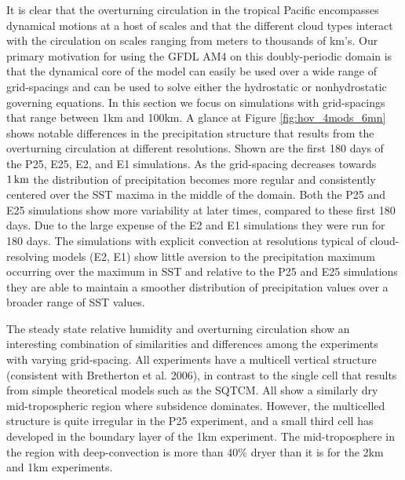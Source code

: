 \documentclass[11pt]{article}   	%
\begin{document}
It is clear that the overturning circulation in the tropical Pacific encompasses dynamical motions at a host of scales and that the 
different cloud types interact with the circulation on scales ranging from meters to thousands of km's.  
Our primary motivation for using the GFDL AM4 on this doubly-periodic domain is that the dynamical core of the model can 
easily be used over a wide range of grid-spacings and can be used to solve either the hydrostatic or nonhydrostatic 
governing equations.  In this section we focus on simulations with grid-spacings that range between 1km and 100km.   
A glance at Figure \ref{fig:hov_4mods_6mn} shows notable differences in the precipitation structure that results from the 
overturning circulation at different resolutions.  Shown are the first 180 days of the P25, E25, E2, and E1 simulations.  As the 
grid-spacing decreases towards $1 \, \rm{km}$ the distribution of precipitation becomes more regular and consistently 
centered over the SST maxima in the middle of the domain.  Both the P25 and E25 simulations show more variability at later 
times, compared to these first 180 days.  Due to the large expense of the E2 and E1 simulations they were run for 
180 days.  The simulations with explicit convection at resolutions typical of cloud-resolving models (E2, E1) show little 
aversion to the precipitation maximum occurring over the maximum in SST and relative to the P25 and E25 simulations 
they are able to maintain a smoother distribution of  precipitation values over a broader range of SST values.    

The steady state relative humidity and overturning circulation show an interesting combination of similarities and differences
among the experiments with varying grid-spacing.  All experiments have a multicell vertical structure (consistent with 
Bretherton et al. 2006), in contrast to the single cell that results from simple theoretical models such as the SQTCM.   All 
show a similarly dry mid-tropospheric region where subsidence dominates.  However, the multicelled structure is quite irregular
in the P25 experiment, and a small third cell has developed in the boundary layer of the 1km experiment.  The mid-troposphere 
in the region with deep-convection is more than $40\%$ dryer than it is for the 2km and 1km experiments. 
\end{document}
